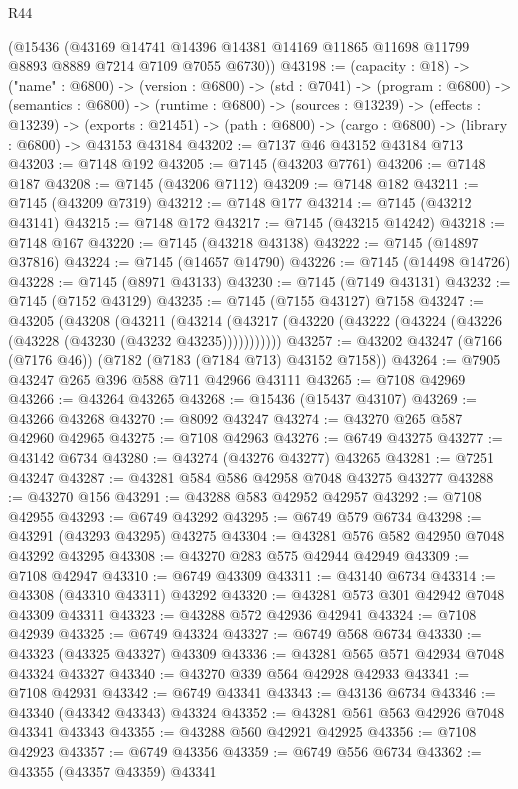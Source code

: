 \begin{lexlean}{R44}
\begin{coremodule}
{    (@15436
      (@43169 @14741 @14396 @14381 @14169 @11865 @11698 @11799 @8893 @8889 @7214 @7109 @7055 @6730))
@43198 := (capacity : @18) ->
  ("name" : @6800) ->
  (version : @6800) ->
  (std : @7041) ->
  (program : @6800) ->
  (semantics : @6800) ->
  (runtime : @6800) ->
  (sources : @13239) ->
  (effects : @13239) ->
  (exports : @21451) -> (path : @6800) -> (cargo : @6800) -> (library : @6800) -> @43153 @43184
@43202 := @7137 @46 @43152 @43184 @713
@43203 := @7148 @192
@43205 := @7145 (@43203 @7761)
@43206 := @7148 @187
@43208 := @7145 (@43206 @7112)
@43209 := @7148 @182
@43211 := @7145 (@43209 @7319)
@43212 := @7148 @177
@43214 := @7145 (@43212 @43141)
@43215 := @7148 @172
@43217 := @7145 (@43215 @14242)
@43218 := @7148 @167
@43220 := @7145 (@43218 @43138)
@43222 := @7145 (@14897 @37816)
@43224 := @7145 (@14657 @14790)
@43226 := @7145 (@14498 @14726)
@43228 := @7145 (@8971 @43133)
@43230 := @7145 (@7149 @43131)
@43232 := @7145 (@7152 @43129)
@43235 := @7145 (@7155 @43127) @7158
@43247 := @43205
    (@43208
      (@43211
        (@43214 (@43217 (@43220 (@43222 (@43224 (@43226 (@43228 (@43230 (@43232 @43235)))))))))))
@43257 := @43202 @43247 (@7166 (@7176 @46)) (@7182 (@7183 (@7184 @713) @43152 @7158))
@43264 := @7905 @43247 @265 @396 @588 @711 @42966 @43111
@43265 := @7108 @42969
@43266 := @43264 @43265
@43268 := @15436 (@15437 @43107)
@43269 := @43266 @43268
@43270 := @8092 @43247
@43274 := @43270 @265 @587 @42960 @42965
@43275 := @7108 @42963
@43276 := @6749 @43275
@43277 := @43142 @6734
@43280 := @43274 (@43276 @43277) @43265
@43281 := @7251 @43247
@43287 := @43281 @584 @586 @42958 @7048 @43275 @43277
@43288 := @43270 @156
@43291 := @43288 @583 @42952 @42957
@43292 := @7108 @42955
@43293 := @6749 @43292
@43295 := @6749 @579 @6734
@43298 := @43291 (@43293 @43295) @43275
@43304 := @43281 @576 @582 @42950 @7048 @43292 @43295
@43308 := @43270 @283 @575 @42944 @42949
@43309 := @7108 @42947
@43310 := @6749 @43309
@43311 := @43140 @6734
@43314 := @43308 (@43310 @43311) @43292
@43320 := @43281 @573 @301 @42942 @7048 @43309 @43311
@43323 := @43288 @572 @42936 @42941
@43324 := @7108 @42939
@43325 := @6749 @43324
@43327 := @6749 @568 @6734
@43330 := @43323 (@43325 @43327) @43309
@43336 := @43281 @565 @571 @42934 @7048 @43324 @43327
@43340 := @43270 @339 @564 @42928 @42933
@43341 := @7108 @42931
@43342 := @6749 @43341
@43343 := @43136 @6734
@43346 := @43340 (@43342 @43343) @43324
@43352 := @43281 @561 @563 @42926 @7048 @43341 @43343
@43355 := @43288 @560 @42921 @42925
@43356 := @7108 @42923
@43357 := @6749 @43356
@43359 := @6749 @556 @6734
@43362 := @43355 (@43357 @43359) @43341
}
\end{coremodule}
\end{lexlean}
